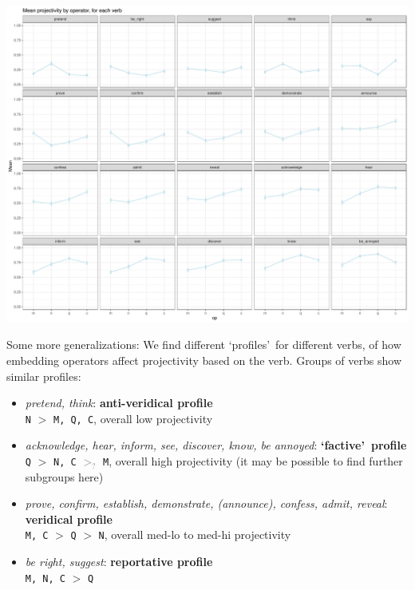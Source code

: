 \documentclass[10pt]{article}\usepackage[]{graphicx}\usepackage[dvipsnames]{xcolor}
\newenvironment{knitrout}{}{} %
\begin{document}
\begin{knitrout}
\color{fgcolor}

{\centering \includegraphics[width=\linewidth]{figures/figuresverb-profiles-1} 

}


\end{knitrout}
Some more generalizations: We find different \lq profiles\rq\ for different verbs, of how embedding operators affect projectivity based on the verb. Groups of verbs show similar profiles:

\begin{itemize}
  \item \emph{pretend, think}: \textbf{anti-veridical profile}\\
    \texttt{N} $>$ \texttt{M, Q, C}, overall low projectivity

  \item \emph{acknowledge, hear, inform, see, discover, know, be annoyed}: \textbf{\lq factive\rq\ profile}\\
    \texttt{Q} $>$ \texttt{N, C} \textcolor{gray}{$>_?$} \texttt{M}, overall high projectivity (it may be possible to find further subgroups here)

  \item \emph{prove, confirm, establish, demonstrate, (announce), confess, admit, reveal}: \textbf{veridical profile}\\
    \texttt{M, C} $>$ \texttt{Q} $>$ \texttt{N}, overall med-lo to med-hi projectivity
  
  \item \emph{be right, suggest}: \textbf{reportative profile}\\
    \texttt{M, N, C} $>$ \texttt{Q}

\end{itemize}
\end{document}
